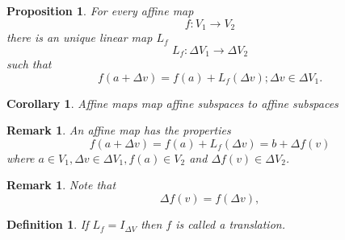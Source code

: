 \documentclass[aps,preprint]{revtex4}%
\newtheorem{corollary}[theorem]{Corollary}
\newtheorem{definition}[theorem]{Definition}
\newtheorem{proposition}[theorem]{Proposition}
\newtheorem{remark}[theorem]{Remark}
\begin{document}
\begin{proposition}
For every affine map
\begin{equation}
f:V_{1}\rightarrow V_{2}%
\end{equation}
there is an unique linear map $L_{f}$%
\begin{equation}
L_{f}:\Delta V_{1}\rightarrow\Delta V_{2}%
\end{equation}
such that
\begin{equation}
f\left(  a+\Delta v\right)  =f\left(  a\right)  +L_{f}\left(  \Delta v\right)
;\Delta v\in\Delta V_{1}.
\end{equation}

\end{proposition}

\begin{corollary}
Affine maps map affine subspaces to affine subspaces
\end{corollary}

\begin{remark}
An affine map has the properties
\begin{equation}
f\left(  a+\Delta v\right)  =f\left(  a\right)  +L_{f}\left(  \Delta v\right)
=b+\Delta f\left(  v\right)
\end{equation}
where $a\in V_{1},\Delta v\in\Delta V_{1},f\left(  a\right)  \in V_{2}$ and
$\Delta f\left(  v\right)  \in\Delta V_{2}$.
\end{remark}

\begin{remark}
Note that
\begin{equation}
\Delta f\left(  v\right)  =f\left(  \Delta v\right)  ,
\end{equation}

\end{remark}

\begin{definition}
If $L_{f}=I_{\Delta V}$ then $f$ is called a \emph{translation}.
\end{definition}
\end{document}
